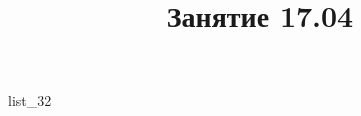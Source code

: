 \documentclass[12pt, a4paper]{article}
\begin{document}
	\title{Занятие 17.04}
	{list_32}
\end{document}
